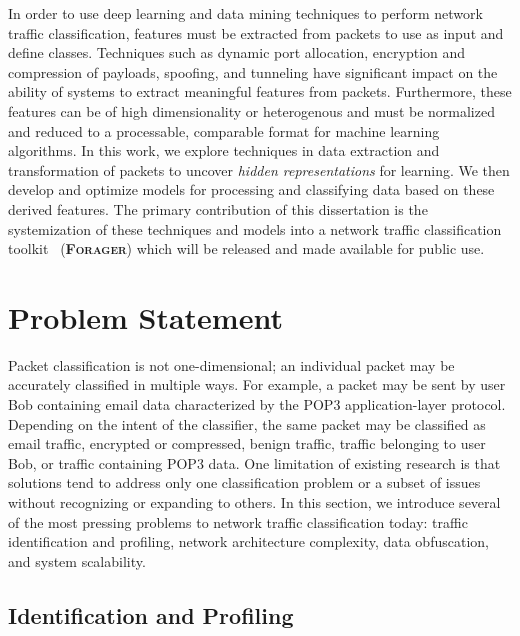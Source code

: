 In order to use deep learning and data mining techniques to perform network traffic classification, features must be extracted from packets to use as input and define classes. Techniques such as dynamic port allocation, encryption and compression of payloads, spoofing, and tunneling have significant impact on the ability of systems to extract meaningful features from packets. Furthermore, these features can be of high dimensionality or heterogenous and must be normalized and reduced to a processable, comparable format for machine learning algorithms. In this work, we explore techniques in data extraction and transformation of packets to uncover \textit{hidden representations} for learning. We then develop and optimize models for processing and classifying data based on these derived features. The primary contribution of this dissertation is the systemization of these techniques and models into a network traffic classification toolkit ~\textsc{(\textbf{Forager})} which will be released and made available for public use.

\section{Problem Statement}

Packet classification is not one-dimensional; an individual packet may be accurately classified in multiple ways. For example, a packet may be sent by user Bob containing email data characterized by the POP3 application-layer protocol. Depending on the intent of the classifier, the same packet may be classified as email traffic, encrypted or compressed, benign traffic, traffic belonging to user Bob, or traffic containing POP3 data. One limitation of existing research is that solutions tend to address only one classification problem or a subset of issues without recognizing or expanding to others. In this section, we introduce several of the most pressing problems to network traffic classification today: traffic identification and profiling, network architecture complexity, data obfuscation, and system scalability.

\subsection{Identification and Profiling}

